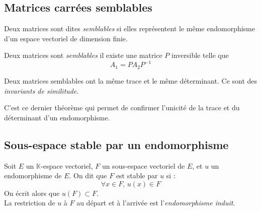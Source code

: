 \documentclass[11pt,a4paper,fleqn,pdftex]{report}
\begin{document}
\subsection{Matrices carrées semblables} %
\label{sub:matrices_carrees_semblables}
\begin{dfn}
     Deux matrices sont dites \emph{semblables} si elles représentent le même endomorphisme d'un espace vectoriel de dimension finie.
\end{dfn}
\begin{theorem}
     Deux matrices sont \emph{semblables} \ssi il existe une matrice $P$ inversible telle que 
     \begin{equation}
     A_1 = P A_2 P^{-1}
     \end{equation}
\end{theorem}
\begin{itheorem}
     Deux matrices semblables ont la même trace et le même déterminant. Ce sont des \emph{invariants de similitude}.%
\end{itheorem}
C'est ce dernier théorème qui permet de confirmer l'unicité de la trace et du déterminant d'un endomorphisme.
\subsection{Sous-espace stable par un endomorphisme} %
\label{sub:sous_espace_stable_par_un_endomorphisme}
\begin{dfn}
     Soit $E$ un $\mathbb{K}$-espace vectoriel, $F$ un sous-espace vectoriel de $E$, et $u$ un endomorphisme de $E$.\newline
     On dit que $F$ est stable par $u$ si :
     \begin{equation}
     \forall x \in F, \, u(x) \in F
     \end{equation}
     On écrit alors que $u(F) \subset F$.\\[0.6\baselineskip]

     La restriction de $u$ à $F$ au départ et à l'arrivée est l'\emph{endomorphisme induit}.
\end{dfn}
\\[\baselineskip]
\needspace{7cm}
\end{document}
